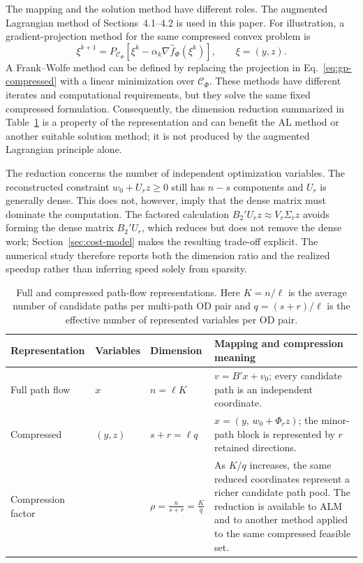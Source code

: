 \documentclass[11pt]{article}
\begin{document}
{The mapping and the solution method have different roles. The augmented Lagrangian method of Sections~4.1--4.2 is used in this paper. For illustration, a gradient-projection method for the same compressed convex problem is
\begin{equation}
\label{eq:gp-compressed}
 \xi^{k+1}=P_{\mathcal C_{\Phi}}\!\left[\xi^k-\alpha_k\nabla\hat f_{\Phi}(\xi^k)\right],
 \qquad \xi=(y,z).
\end{equation}
A Frank--Wolfe method can be defined by replacing the projection in Eq.~\eqref{eq:gp-compressed} with a linear minimization over $\mathcal C_{\Phi}$. These methods have different iterates and computational requirements, but they solve the same fixed compressed formulation. Consequently, the dimension reduction summarized in Table~\ref{tab:compression-summary} is a property of the representation and can benefit the AL method or another suitable solution method; it is not produced by the augmented Lagrangian principle alone.

The reduction concerns the number of independent optimization variables. The reconstructed constraint $w_0+U_rz\geq0$ still has $n-s$ components and $U_r$ is generally dense. This does not, however, imply that the dense matrix must dominate the computation. The factored calculation $B_2'U_rz\approx V_r\Sigma_rz$ avoids forming the dense matrix $B_2'U_r$, which reduces but does not remove the dense work; Section~\ref{sec:cost-model} makes the resulting trade-off explicit. The numerical study therefore reports both the dimension ratio and the realized speedup rather than inferring speed solely from sparsity.
}

\begin{table}[ht]
\centering
{\color{red}
\caption{Full and compressed path-flow representations. Here $K=n/\ell$ is the average number of candidate paths per multi-path OD pair and $q=(s+r)/\ell$ is the effective number of represented variables per OD pair.}
\label{tab:compression-summary}
\small
\begin{tabular}{p{}p{}p{}p{}}
\toprule
Representation & Variables & Dimension & Mapping and compression meaning \\
\midrule
Full path flow & $x$ & $n=\ell K$ & $v=B'x+v_0$; every candidate path is an independent coordinate. \\
Compressed & $(y,z)$ & $s+r=\ell q$ & $x=(y,\,w_0+\Phi_rz)$; the minor-path block is represented by $r$ retained directions. \\
\midrule
Compression factor &  & $\displaystyle\rho=\frac{n}{s+r}=\frac{K}{q}$ & As $K/q$ increases, the same reduced coordinates represent a richer candidate path pool. The reduction is available to ALM and to another method applied to the same compressed feasible set. \\
\bottomrule
\end{tabular}
}
\end{table}
\end{document}
